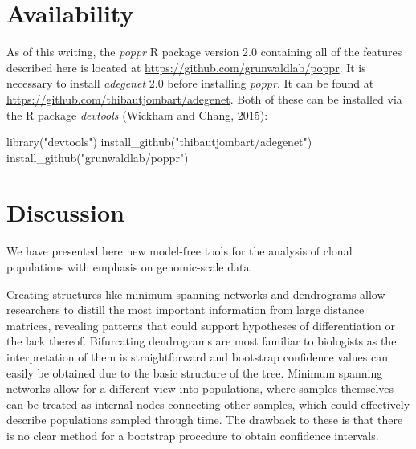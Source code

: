 \documentclass{frontiersSCNS} %
\newenvironment{CodeChunk}{}{}
\begin{document}
\section*{Availability}\label{availability}

As of this writing, the \emph{poppr} R package version 2.0 containing
all of the features described here is located at
\url{https://github.com/grunwaldlab/poppr}. It is necessary to install
\emph{adegenet} 2.0 before installing \emph{poppr}. It can be found at
\url{https://github.com/thibautjombart/adegenet}. Both of these can be
installed via the R package \emph{devtools} (Wickham and Chang, 2015):

\begin{CodeChunk}
\begin{CodeInput}
library("devtools")
install_github("thibautjombart/adegenet")
install_github("grunwaldlab/poppr")
\end{CodeInput}
\end{CodeChunk}

\section*{Discussion}\label{discussion}

We have presented here new model-free tools for the analysis of clonal
populations with emphasis on genomic-scale data.

Creating structures like minimum spanning networks and dendrograms allow
researchers to distill the most important information from large
distance matrices, revealing patterns that could support hypotheses of
differentiation or the lack thereof. Bifurcating dendrograms are most
familiar to biologists as the interpretation of them is straightforward
and bootstrap confidence values can easily be obtained due to the basic
structure of the tree. Minimum spanning networks allow for a different
view into populations, where samples themselves can be treated as
internal nodes connecting other samples, which could effectively
describe populations sampled through time. The drawback to these is that
there is no clear method for a bootstrap procedure to obtain confidence
intervals.
\end{document}
